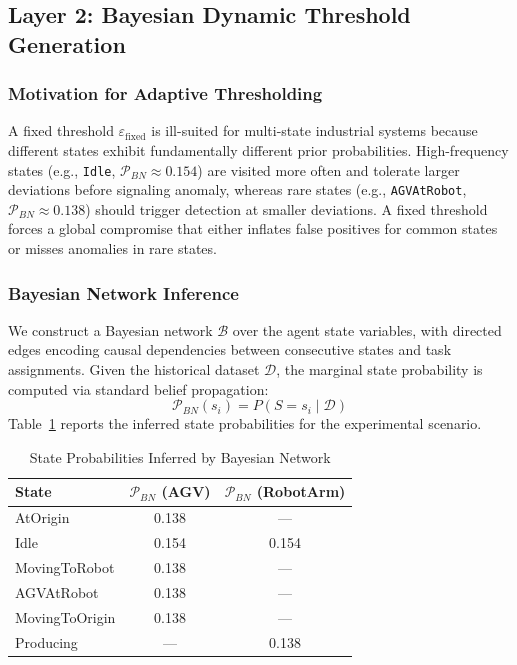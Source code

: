 \documentclass[manuscript,screen,review]{acmart}
\begin{document}
\subsection{Layer 2: Bayesian Dynamic Threshold Generation}
\label{subsec:layer2}

\subsubsection{Motivation for Adaptive Thresholding}

A fixed threshold $\varepsilon_{\text{fixed}}$ is ill-suited
for multi-state industrial systems because different states
exhibit fundamentally different prior probabilities. High-frequency
states (e.g., \texttt{Idle}, $\mathcal{P}_{BN} \approx 0.154$)
are visited more often and tolerate larger deviations before
signaling anomaly, whereas rare states (e.g., \texttt{AGVAtRobot},
$\mathcal{P}_{BN} \approx 0.138$) should trigger detection
at smaller deviations. A fixed threshold forces a global
compromise that either inflates false positives for common
states or misses anomalies in rare states.

\subsubsection{Bayesian Network Inference}

We construct a Bayesian network $\mathcal{B}$ over the agent
state variables, with directed edges encoding causal
dependencies between consecutive states and task assignments.
Given the historical dataset $\mathcal{D}$, the marginal
state probability is computed via standard belief propagation:
\begin{equation}
  \mathcal{P}_{BN}(s_i) = P(S = s_i \mid \mathcal{D})
  \label{eq:bn_inference}
\end{equation}
Table~\ref{tab:bn_probs} reports the inferred state
probabilities for the experimental scenario.

\begin{table}[!t]
\renewcommand{\arraystretch}{1.3}
\caption{State Probabilities Inferred by Bayesian Network}
\label{tab:bn_probs}
\centering
\begin{tabular}{lcc}
\toprule
\textbf{State} & \textbf{$\mathcal{P}_{BN}$ (AGV)} &
\textbf{$\mathcal{P}_{BN}$ (RobotArm)} \\
\midrule
AtOrigin        & 0.138 & ---   \\
Idle            & 0.154 & 0.154 \\
MovingToRobot     & 0.138 & ---   \\
AGVAtRobot           & 0.138 & ---   \\
MovingToOrigin  & 0.138 & ---   \\
Producing       & ---   & 0.138 \\
\bottomrule
\end{tabular}
\end{table}
\end{document}
